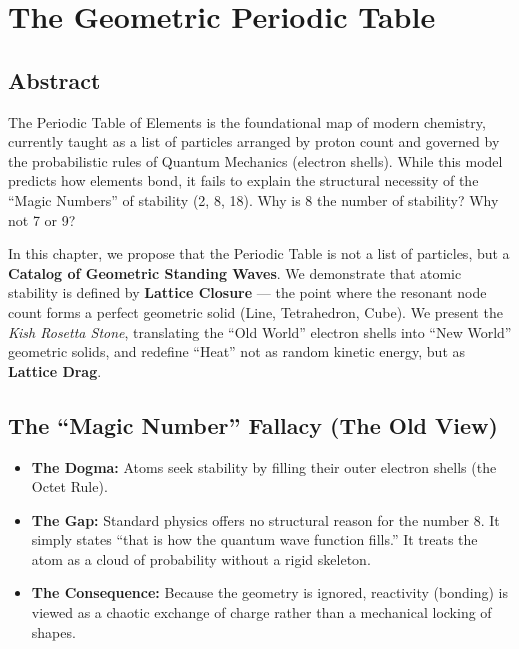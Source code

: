 \documentclass[11pt, letterpaper, openany]{book}
\begin{document}
\tableofcontents
\clearpage

\chapter{The Geometric Periodic Table}

\section{Abstract}

The Periodic Table of Elements is the foundational map of modern chemistry, currently
taught as a list of particles arranged by proton count and governed by the probabilistic
rules of Quantum Mechanics (electron shells). While this model predicts how elements
bond, it fails to explain the structural necessity of the “Magic Numbers” of stability (2, 8,
18). Why is 8 the number of stability? Why not 7 or 9?

In this chapter, we propose that the Periodic Table is not a list of particles, but a
\textbf{Catalog of Geometric Standing Waves}. We demonstrate that atomic stability is
defined by \textbf{Lattice Closure} — the point where the resonant node count forms a
perfect geometric solid (Line, Tetrahedron, Cube). We present the \textit{Kish Rosetta
Stone}, translating the “Old World” electron shells into “New World” geometric solids,
and redefine “Heat” not as random kinetic energy, but as \textbf{Lattice Drag}.

\section{The ``Magic Number'' Fallacy (The Old View)}

\begin{itemize}
    \item \textbf{The Dogma:} Atoms seek stability by filling their outer electron shells (the Octet Rule).
    \item \textbf{The Gap:} Standard physics offers no structural reason for the number 8. It simply
    states “that is how the quantum wave function fills.” It treats the atom as a cloud of
    probability without a rigid skeleton.
    \item \textbf{The Consequence:} Because the geometry is ignored, reactivity (bonding) is viewed
    as a chaotic exchange of charge rather than a mechanical locking of shapes.
\end{itemize}
\end{document}

